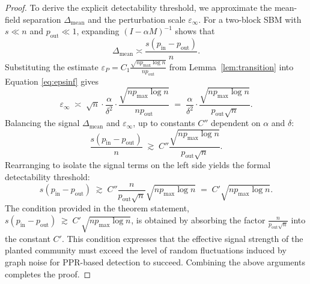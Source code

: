 \begin{proof}
\vspace{3mm}
\noindent To derive the explicit detectability threshold, we approximate the mean-field separation $\Delta_{\mathrm{mean}}$
and the perturbation scale $\varepsilon_{\infty}$.
For a two-block SBM with $s \ll n$ and $p_{\mathrm{out}}\ll 1$, expanding $(I - \alpha M)^{-1}$ shows that
\[
\Delta_{\mathrm{mean}} \asymp \frac{s(p_{\mathrm{in}} - p_{\mathrm{out}})}{n}.
\]
Substituting the estimate
$\varepsilon_P = C_1\frac{\sqrt{n p_{\max}\log n}}{n p_{\mathrm{out}}}$
from Lemma~\ref{lem:transition} into Equation \eqref{eq:epsinf}
gives
\[
\varepsilon_{\infty}
\;\asymp\;
\sqrt{n}\cdot\frac{\alpha}{\delta^2}\cdot
\frac{\sqrt{n p_{\max}\log n}}{n p_{\mathrm{out}}}
\;=\;
\frac{\alpha}{\delta^2}\cdot
\frac{\sqrt{n p_{\max}\log n}}{p_{\mathrm{out}}\sqrt{n}}.
\]
Balancing the signal $\Delta_{\mathrm{mean}}$ and $\varepsilon_{\infty}$, up to constants $C''$ dependent on $\alpha$ and $\delta$:
\[
\frac{s(p_{\mathrm{in}} - p_{\mathrm{out}})}{n}
\;\gtrsim\;
C''\frac{\sqrt{n p_{\max}\log n}}{p_{\mathrm{out}}\sqrt{n}}.
\]
Rearranging to isolate the signal terms on the left side yields the formal detectability threshold:
\[
s(p_{\mathrm{in}} - p_{\mathrm{out}})
\;\gtrsim\;
C''\frac{n}{p_{\mathrm{out}}\sqrt{n}} \sqrt{n p_{\max}\log n}
\;=\;
C'\sqrt{np_{\max}\log n}.
\]
The condition provided in the theorem statement,
$s(p_{\mathrm{in}}-p_{\mathrm{out}}) \;\gtrsim\; C'\sqrt{n p_{\max}\log n}$, is obtained by absorbing the factor $\frac{n}{p_{\mathrm{out}}\sqrt{n}}$ into the constant $C'$. This condition expresses that the effective signal strength of the planted community must exceed the level of random fluctuations induced by graph noise for PPR-based detection to succeed. Combining the above arguments completes the proof.


\end{proof}
